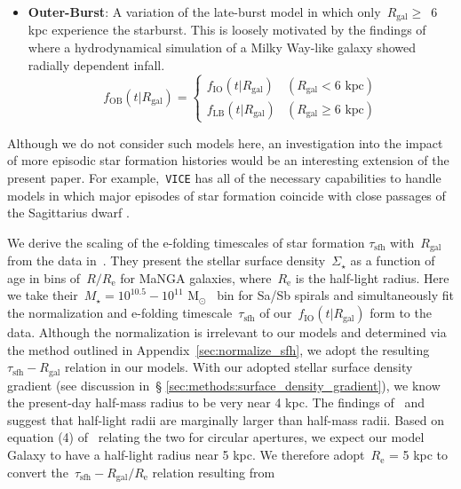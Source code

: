 \documentclass[fleqn, usenatbib]{mnras}
\newcommand{\msun}{\ensuremath{\text{M}_\odot}}
\begin{document}
\begin{itemize}
	\item \textbf{Outer-Burst}: A variation of the late-burst model in which 
	only~$R_\text{gal} \geq$~6 kpc experience the starburst. This is loosely 
	motivated by the findings of~\citet{Vincenzo2020} where a hydrodynamical 
	simulation of a Milky Way-like galaxy showed radially dependent infall. 
	\begin{equation} 
	f_\text{OB}(t|R_\text{gal}) = \begin{cases} 
	f_\text{IO}(t|R_\text{gal}) & (R_\text{gal} < 6\text{ kpc}) \\ 
	f_\text{LB}(t|R_\text{gal}) & (R_\text{gal} \geq 6\text{ kpc}) 
	\end{cases} 
	\label{eq:outerburst_sfh} 
	\end{equation} 
\end{itemize} 
Although we do not consider such models here, an investigation into the impact 
of more episodic star formation histories would be an interesting extension of 
the present paper. For example,~\texttt{VICE} has all of the necessary 
capabilities to handle models in which major episodes of star formation 
coincide with close passages of the Sagittarius dwarf 
\citep[e.g.][]{RuizLara2020}. 
\par 
We derive the scaling of the e-folding timescales of star formation 
$\tau_\text{sfh}$ with~$R_\text{gal}$ from the data in~\citet{Sanchez2020}. 
They present the stellar surface density~$\Sigma_\star$ as a function of age 
in bins of~$R/R_\text{e}$ for MaNGA galaxies, where~$R_\text{e}$ is the 
half-light radius. Here we take their~$M_\star = 10^{10.5} - 10^{11}$ 
\msun~ bin for Sa/Sb spirals and simultaneously fit the normalization and 
e-folding timescale~$\tau_\text{sfh}$ of our~$f_\text{IO}(t|R_\text{gal})$ form 
to the data. Although the normalization is irrelevant to our models and 
determined via the method outlined in Appendix~\ref{sec:normalize_sfh}, we 
adopt the resulting~$\tau_\text{sfh}-R_\text{gal}$ relation in our models. With 
our adopted stellar surface density gradient (see discussion in~\S 
\ref{sec:methods:surface_density_gradient}), we know the present-day half-mass 
radius to be very near 4 kpc. The findings of~\citet{Garcia-Benito2017} and 
\citet{GonzalezDelgado2014} suggest that half-light radii are marginally larger 
than half-mass radii. Based on equation (4) of~\citet{GonzalezDelgado2014} 
relating the two for circular apertures, we expect our model Galaxy to have a 
half-light radius near 5 kpc. We therefore adopt~$R_\text{e}$ = 5 kpc to 
convert the~$\tau_\text{sfh}-R_\text{gal}/R_\text{e}$ relation resulting from 
\end{document}
